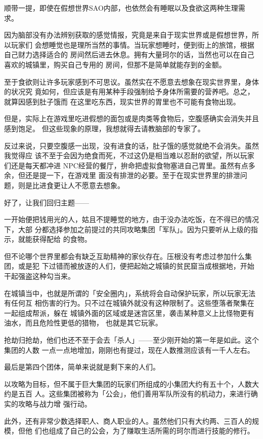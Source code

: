 \documentclass[11pt]{book}
\begin{document}
顺带一提，即使在假想世界SAO内部，也依然会有睡眠以及食欲这两种生理需求。

因为脑部没有办法辨别获取的感觉情报，究竟是来自于现实世界或是假想世界，所以玩家们
会想睡觉也是理所当然的事情。当玩家想睡时，便到街上的旅馆，根据自己财力选择适合的
房间然后进去休息。拥有大量珂尔的话，当然也可以在自己喜欢的城镇里，购买自己专用的
房间，但那不是简单就能存到的金额。

至于食欲则让许多玩家感到不可思议。虽然实在不愿意去想象在现实世界里，身体的状况究
竟如何，但应该是有用某种手段强制给予身体所需要的营养吧。总之，就算因感到肚子饿而
在这里吃东西，现实世界的胃里也不可能有食物出现。

但是，实际上在游戏里吃进假想的面包或是肉类等食物后，空腹感确实会消失并且感到饱足。
但这些现象的原理，我想就得去请教脑部的专家了。

反过来说，只要空腹感一出现，没有进食的话，肚子饿的感觉就绝不会消失。虽然我觉得应
该不至于会因为绝食而死，不过这仍是相当难以忍耐的欲望，所以玩家们还是每天都冲进
NPC经营的餐厅，拚命把虚拟食物塞进自己胃里。虽然有点多余，但还是提一下，在游戏里
面没有排泄的必要。至于在现实世界里的排泄问题，则是比进食更让人不愿意去想象。

好了，让我们回归主题——

一开始便把钱用光的人，姑且不提睡觉的地方，由于没办法吃饭，在不得已的情况下，大部
分都选择参加之前提过的共同攻略集团「军队」。因为只要听从上级的指示，就能获得配给
的食物。

但不论哪个世界里都会有缺乏互助精神的家伙存在。压根没有考虑过参加什么集团，或是犯
下过错而被放逐的人们，便把起始之城镇的贫民窟当成根据地，开始干起强盗这种勾当来。

在城镇当中，也就是所谓的「安全圈内」，系统将会自动保护玩家，所以玩家无法有任何互
相伤害的行为。只不过在城镇外就没有这种限制了。这些堕落者聚集在一起组成帮派，躲在
城镇外面的区域或是迷宫区里，袭击某种意义上比怪物更有油水，而且危险性更低的猎物，
也就是其它玩家。

抢劫归抢劫，他们也还不至于会去「杀人」——至少刚开始的第一年是如此。这个集团的人数
一点一点地增加，刚刚也有提过，现在人数推测应该有一千人左右。

最后是第四个团体，简单来说就是剩下来的人们。

以攻略为目标，但不属于巨大集团的玩家们所组成的小集团大约有五十个，人数大约是五百
人。这些集团被称为「公会」，他们善用军队所没有的机动力，来进行确实的攻略与战力增
强行动。

此外，还有非常少数选择职人、商人职业的人。虽然他们只有大约两、三百人的规模，但他
们也组成了自己的公会，为了赚取生活所需的珂尔而进行技能的修行。
\end{document}
